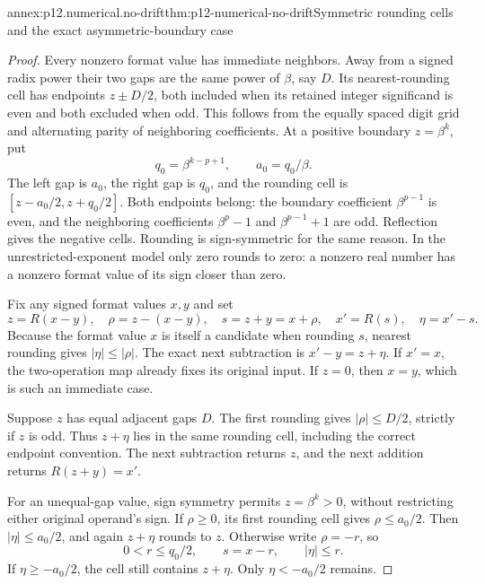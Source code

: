 \begin{annexitem}{annex:p12.numerical.no-drift}{thm:p12-numerical-no-drift}{Symmetric rounding cells and the exact asymmetric-boundary case}
\begin{proof}
Every nonzero format value has immediate neighbors. Away from a signed
radix power their two gaps are the same power of \(\beta\), say
\(D\). Its nearest-rounding cell has endpoints \(z\pm D/2\),
both included when its retained integer significand is even and both
excluded when odd. This follows from the equally spaced digit grid
and alternating parity of neighboring coefficients. At a positive
boundary \(z=\beta^k\), put
\[
 q_0=\beta^{k-p+1},\qquad a_0=q_0/\beta.
\]
The left gap is \(a_0\), the right gap is \(q_0\), and the
rounding cell is \([z-a_0/2,z+q_0/2]\). Both endpoints belong:
the boundary coefficient \(\beta^{p-1}\) is even, and the
neighboring coefficients \(\beta^p-1\) and \(\beta^{p-1}+1\)
are odd. Reflection gives the negative cells. Rounding is
sign-symmetric for the same reason. In the unrestricted-exponent
model only zero rounds to zero: a nonzero real number has a
nonzero format value of its sign closer than zero.

Fix any signed format values \(x,y\) and set
\[
 z=R(x-y),\quad \rho=z-(x-y),\quad s=z+y=x+\rho,
 \quad x'=R(s),\quad\eta=x'-s.
\]
Because the format value \(x\) is itself a candidate when rounding
\(s\), nearest rounding gives \(|\eta|\leq|\rho|\).
The exact next subtraction is \(x'-y=z+\eta\).
If \(x'=x\), the two-operation map already fixes its original
input. If \(z=0\), then \(x=y\), which is such an immediate case.

Suppose \(z\) has equal adjacent gaps \(D\). The first rounding
gives \(|\rho|\leq D/2\), strictly if \(z\) is odd. Thus
\(z+\eta\) lies in the same rounding cell, including the correct
endpoint convention. The next subtraction returns \(z\), and
the next addition returns \(R(z+y)=x'\).

For an unequal-gap value, sign symmetry permits \(z=\beta^k>0\),
without restricting either original operand's sign. If \(\rho\geq0\),
its first rounding cell gives \(\rho\leq a_0/2\). Then
\(|\eta|\leq a_0/2\), and again \(z+\eta\) rounds to \(z\).
Otherwise write \(\rho=-r\), so
\[
 0<r\leq q_0/2,\qquad s=x-r,\qquad |\eta|\leq r.
\]
If \(\eta\geq-a_0/2\), the cell still contains \(z+\eta\).
Only \(\eta<-a_0/2\) remains.


\end{proof}
\end{annexitem}
